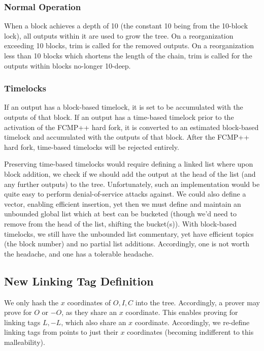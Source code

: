 \documentclass[]{article}
\begin{document}
\subsubsection{Normal Operation}

When a block achieves a depth of 10 (the constant 10 being from the 10-block lock), all outputs within it are used to grow the tree. On a reorganization exceeding 10 blocks, trim is called for the removed outputs. On a reorganization less than 10 blocks which shortens the length of the chain, trim is called for the outputs within blocks no-longer 10-deep.

\subsubsection{Timelocks}

If an output has a block-based timelock, it is set to be accumulated with the outputs of that block. If an output has a time-based timelock prior to the activation of the FCMP++ hard fork, it is converted to an estimated block-based timelock and accumulated with the outputs of that block. After the FCMP++ hard fork, time-based timelocks will be rejected entirely.

Preserving time-based timelocks would require defining a linked list where upon block addition, we check if we should add the output at the head of the list (and any further outputs) to the tree. Unfortunately, such an implementation would be quite easy to perform denial-of-service attacks against. We could also define a vector, enabling efficient insertion, yet then we must define and maintain an unbounded global list which at best can be bucketed (though we'd need to remove from the head of the list, shifting the bucket(s)). With block-based timelocks, we still have the unbounded list commentary, yet have efficient topics (the block number) and no partial list additions. Accordingly, one is not worth the headache, and one has a tolerable headache.

\subsection{New Linking Tag Definition}

We only hash the $x$ coordinates of $O, I, C$ into the tree. Accordingly, a prover may prove for $O$ or $-O$, as they share an $x$ coordinate. This enables proving for linking tags $L, -L$, which also share an $x$ coordinate. Accordingly, we re-define linking tags from points to just their $x$ coordinates (becoming indifferent to this malleability).
\end{document}

